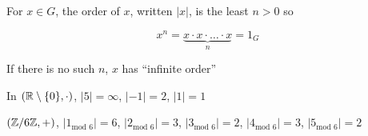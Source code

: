 \begin{definition*}
  For $x \in G$, the order of $x$, written $|x|$, is the least $n > 0$ so

  \[x^n = \underbrace{x\cdot x\cdot \dotsc \cdot x}_n = 1_G\]
\end{definition*}
If there is no such $n$, $x$ has ``infinite order''
\begin{example*}
  In $(\mathbb R \setminus \{0\}, \cdot)$, $|5| = \infty$, $|-1| = 2$, $|1| = 1$
\end{example*}

\begin{example*}
  $(\mathbb Z/6\mathbb Z, +)$, $|1_{\text{mod } 6}| = 6$, $|2_{\text{mod } 6}| = 3$, $|3_{\text{mod } 6}| = 2$, $|4_{\text{mod } 6}| = 3$, $|5_{\text{mod } 6}| = 2$
\end{example*}